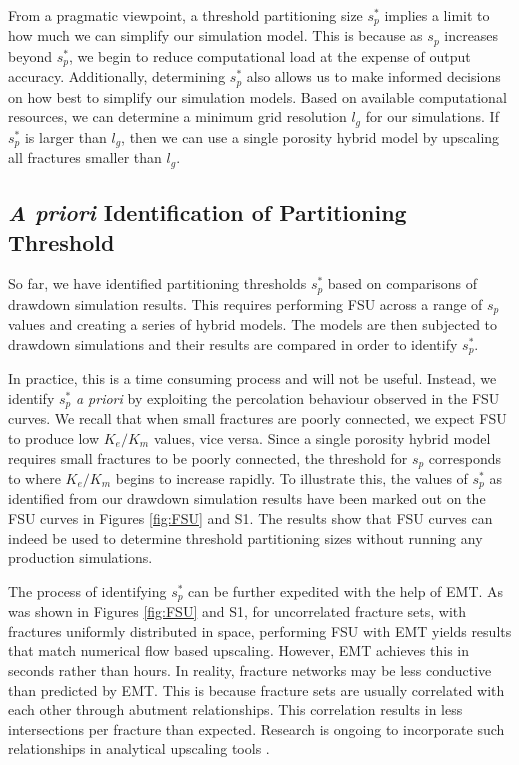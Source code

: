 \documentclass[draft]{agujournal2018}
\begin{document}
From a pragmatic viewpoint, a threshold partitioning size $s_p^*$ implies a limit to how much we can simplify our simulation model. This is because as $s_p$ increases beyond $s_p^*$, we begin to reduce computational load at the expense of output accuracy. Additionally, determining $s_p^*$ also allows us to make informed decisions on how best to simplify our simulation models. Based on available computational resources, we can determine a minimum grid resolution $l_{g}$ for our simulations. If $s_p^*$ is larger than $l_{g}$, then we can use a single porosity hybrid model by upscaling all fractures smaller than $l_{g}$.


\subsection{\textit{A priori} Identification of Partitioning Threshold}
So far, we have identified partitioning thresholds $s_p^*$ based on comparisons of drawdown simulation results. This requires performing FSU across a range of $s_p$ values and creating a series of hybrid models. The models are then subjected to drawdown simulations and their results are compared in order to identify $s_p^*$.

In practice, this is a time consuming process and will not be useful. Instead, we identify $s_p^*$ \textit{a priori} by exploiting the percolation behaviour observed in the FSU curves. We recall that when small fractures are poorly connected, we expect FSU to produce low $K_e/K_m$ values, vice versa. Since a single porosity hybrid model requires small fractures to be poorly connected, the threshold for $s_p$ corresponds to where $K_e/K_m$ begins to increase rapidly. To illustrate this, the values of $s_p^*$ as identified from our drawdown simulation results have been marked out on the FSU curves in Figures \ref{fig:FSU} and S1. The results show that FSU curves can indeed be used to determine threshold partitioning sizes without running any production simulations.

The process of identifying $s_p^*$ can be further expedited with the help of EMT. As was shown in Figures \ref{fig:FSU} and S1, for uncorrelated fracture sets, with fractures uniformly distributed in space, performing FSU with EMT yields results that match numerical flow based upscaling. However, EMT achieves this in seconds rather than hours. In reality, fracture networks may be less conductive than predicted by EMT. This is because fracture sets are usually correlated with each other through abutment relationships. This correlation results in less intersections per fracture than expected. Research is ongoing to incorporate such relationships in analytical upscaling tools \citep{Hardebol2015, Makel2007, Saevik2017}. 
\end{document}
